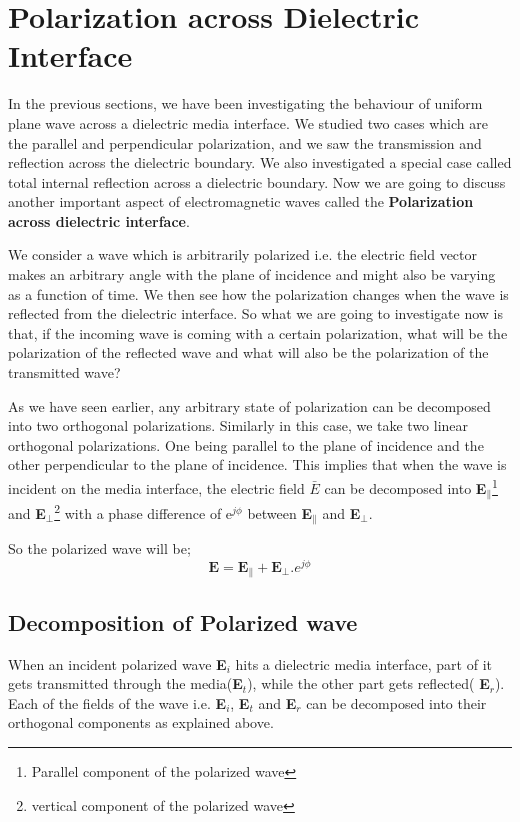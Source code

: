 \chapter{Polarization across Dielectric Interface}\label{lec:lec33}
In the previous sections, we have been investigating the behaviour of uniform plane wave across a dielectric media interface. We studied two cases which are the parallel and perpendicular polarization, and we saw the transmission and reflection across the dielectric boundary. We also investigated a special case called total internal reflection across a dielectric boundary. Now we are going to discuss another important aspect of electromagnetic waves called the \textbf{Polarization across dielectric interface}. 

We consider a wave which is arbitrarily polarized i.e. the electric field vector makes an arbitrary angle with the plane of incidence and might also be varying as a function of time. We then see how the polarization changes when the wave is reflected from the dielectric interface. So what we are going to investigate now is that, if the incoming wave is coming with a certain polarization, what will be the polarization of the reflected wave and what will also be the polarization of the transmitted wave?

As we have seen earlier, any arbitrary state of polarization can be decomposed into two orthogonal polarizations. Similarly in this case, we take two linear orthogonal polarizations. One being parallel to the plane of incidence and the other perpendicular to the plane of incidence. This implies that when the wave is incident on the media interface, the electric field \textbf{$\bar{E}$} can be decomposed into \textbf{E}$_\parallel$\footnote{Parallel component of the polarized wave} and \textbf{E}$_\perp$\footnote{vertical component of the polarized wave} with a phase difference of e$^{j\phi}$ between \textbf{E}$_\parallel$ and \textbf{E}$_\perp$.

 So the polarized wave will be; $$\textbf{E} = \textbf{E}_\parallel + \textbf{E}_\perp.e^{j\phi}$$	
 
\section{Decomposition of Polarized wave}	
When an incident polarized wave \textbf{E$_i$} hits a dielectric media interface, part of it gets transmitted through the media(\textbf{E$_t$}), while the other part gets reflected( \textbf{E$_r$}). Each of the fields of the wave i.e. \textbf{E$_i$}, \textbf{E$_t$} and \textbf{E$_r$} can be decomposed into their orthogonal components as explained above.	
